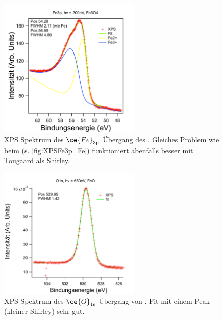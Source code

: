             \begin{figure}
                \centering
                \includegraphics[width=0.6\textwidth]{./content/pictures/Fe3O4/Fe3p_Fe3O4.png}
                \caption{XPS Spektrum des $\ce{Fe}_{3\text{p}}$ Übergang des . Gleiches Problem wie beim  (s. \autoref{fig:XPSFe3p_Fe}) funktioniert abenfalls besser mit Tougaard als Shirley.}
                \label{fig:XPSFe3p_Fe3O4}
            \end{figure}
            \begin{figure}
                \centering
                \includegraphics[width=0.6\textwidth]{./content/pictures/FeO/O1s_FeO.png}
                \caption{XPS Spektrum des $\ce{O}_{1\text{s}}$ Übergang von . Fit mit einem Peak (kleiner Shirley) sehr gut.}
                \label{fig:XPSO1s_FeO}
            \end{figure}
